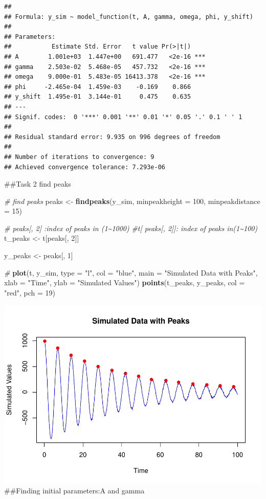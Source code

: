 \documentclass[
]{article}
\newenvironment{Shaded}{\begin{snugshade}}{\end{snugshade}}
\newcommand{\AttributeTok}[1]{\textcolor[rgb]{0.13,0.29,0.53}{#1}}
\newcommand{\CommentTok}[1]{\textcolor[rgb]{0.56,0.35,0.01}{\textit{#1}}}
\newcommand{\DecValTok}[1]{\textcolor[rgb]{0.00,0.00,0.81}{#1}}
\newcommand{\FunctionTok}[1]{\textcolor[rgb]{0.13,0.29,0.53}{\textbf{#1}}}
\newcommand{\NormalTok}[1]{#1}
\newcommand{\OtherTok}[1]{\textcolor[rgb]{0.56,0.35,0.01}{#1}}
\newcommand{\StringTok}[1]{\textcolor[rgb]{0.31,0.60,0.02}{#1}}
\begin{document}
\begin{verbatim}
## 
## Formula: y_sim ~ model_function(t, A, gamma, omega, phi, y_shift)
## 
## Parameters:
##           Estimate Std. Error   t value Pr(>|t|)    
## A        1.001e+03  1.447e+00   691.477   <2e-16 ***
## gamma    2.503e-02  5.468e-05   457.732   <2e-16 ***
## omega    9.000e-01  5.483e-05 16413.378   <2e-16 ***
## phi     -2.465e-04  1.459e-03    -0.169    0.866    
## y_shift  1.495e-01  3.144e-01     0.475    0.635    
## ---
## Signif. codes:  0 '***' 0.001 '**' 0.01 '*' 0.05 '.' 0.1 ' ' 1
## 
## Residual standard error: 9.935 on 996 degrees of freedom
## 
## Number of iterations to convergence: 9 
## Achieved convergence tolerance: 7.293e-06
\end{verbatim}

\#\#Task 2 find peaks

\begin{Shaded}
\begin{Highlighting}[]
\CommentTok{\# find peaks}
\NormalTok{peaks }\OtherTok{\textless{}{-}} \FunctionTok{findpeaks}\NormalTok{(y\_sim, }\AttributeTok{minpeakheight =} \DecValTok{100}\NormalTok{, }\AttributeTok{minpeakdistance =} \DecValTok{15}\NormalTok{) }

\CommentTok{\# peaks[, 2] :index of peaks in (1\textasciitilde{}1000)}
\CommentTok{\#t[ peaks[, 2]]: index of peaks in(1\textasciitilde{}100)}
\NormalTok{t\_peaks }\OtherTok{\textless{}{-}}\NormalTok{ t[peaks[, }\DecValTok{2}\NormalTok{]] }

\NormalTok{y\_peaks }\OtherTok{\textless{}{-}}\NormalTok{ peaks[, }\DecValTok{1}\NormalTok{]}

\CommentTok{\#}
\FunctionTok{plot}\NormalTok{(t, y\_sim, }\AttributeTok{type =} \StringTok{"l"}\NormalTok{, }\AttributeTok{col =} \StringTok{"blue"}\NormalTok{, }\AttributeTok{main =} \StringTok{"Simulated Data with Peaks"}\NormalTok{, }\AttributeTok{xlab =} \StringTok{"Time"}\NormalTok{, }\AttributeTok{ylab =} \StringTok{"Simulated Values"}\NormalTok{)}
\FunctionTok{points}\NormalTok{(t\_peaks, y\_peaks, }\AttributeTok{col =} \StringTok{"red"}\NormalTok{, }\AttributeTok{pch =} \DecValTok{19}\NormalTok{)}
\end{Highlighting}
\end{Shaded}

\includegraphics{CircadianProjectForMcManus_files/figure-latex/unnamed-chunk-9-1.pdf}
\#\#Finding initial parameters:A and gamma
\end{document}
